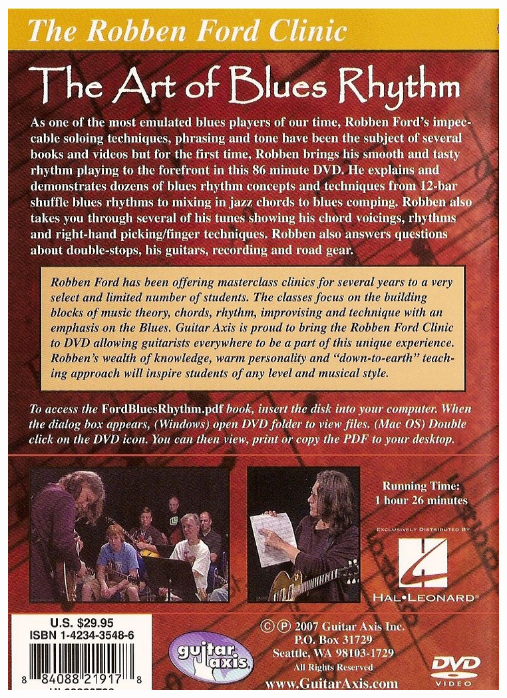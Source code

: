 \documentclass[a4paper]{book}
\begin{document}
\begin{center}
\includegraphics[width=13.005cm,height=18.034cm]{lebluessupportsmethodes-img140.jpg}
\end{center}



\clearpage
\end{document}

